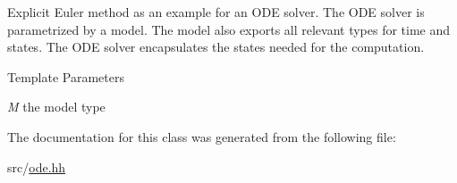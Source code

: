 Explicit Euler method as an example for an ODE solver. The ODE solver is parametrized by a model. The model also exports all relevant types for time and states. The ODE solver encapsulates the states needed for the computation.


\begin{DoxyTemplParams}{Template Parameters}
\item[{\em M}]the model type \end{DoxyTemplParams}


The documentation for this class was generated from the following file:\begin{DoxyCompactItemize}
\item 
src/\hyperlink{ode_8hh}{ode.hh}\end{DoxyCompactItemize}
